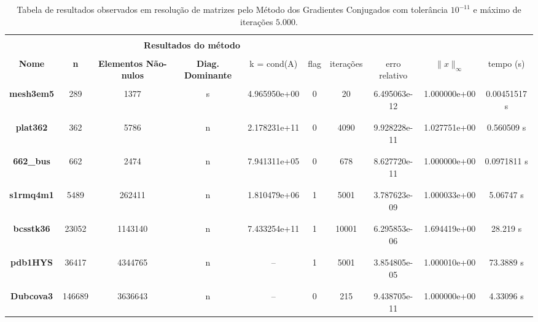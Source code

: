 
\begin{table}[ht]
    \centering
    \begin{tabular}{|c|c|c|c|c|c|c|c|c|c|}
        \hline \rowcolor{Gray}
        \multicolumn{10}{|c|}{\bfseries Tabela do Método dos Gradientes Conjugados com tolerância $10^{-11}$ e máximo de iterações $5.000$ }\\
        \hline \rowcolor{Gray}  \multicolumn{5}{|c|}{} & \multicolumn{5}{|c|}{} \\
         [-1em]  \rowcolor{Gray}
         \multicolumn{5}{|c|}{\bfseries Informações da matriz } & \multicolumn{5}{|c|}{\bfseries Resultados do método }\\
         \hline \rowcolor{Gray} & & & & & & & & & \\
         [-1em]
         \rowcolor{Gray}
         \bfseries Nome & \bfseries n & \bfseries Elementos Não-nulos & \bfseries Diag. Dominante &
         k = cond(A) & flag & iterações &
         erro relativo &
         $\|x\|_\infty$  & tempo (s) \\
         \hline & & & & & & & & & \\
         [-1em] \bfseries mesh3em5 & 289 & 1377 & s & 4.965950e+00 & 0 & 20 & 6.495063e-12 & 1.000000e+00  & 0.00451517 s \\ & & & & & & & & & \\ [-1em] \hline \\
         [-1em] \bfseries plat362 & 362 & 5786 & n & 2.178231e+11 & 0 & 4090 & 9.928228e-11 & 1.027751e+00 & 0.560509 s \\ & & & & & & & & & \\ [-1em] \hline \\
         [-1em] \bfseries 662\_bus & 662 & 2474 & n & 7.941311e+05 & 0 & 678 & 8.627720e-11 & 1.000000e+00  & 0.0971811 s \\ & & & & & & & & & \\ [-1em] \hline \\
         [-1em] \bfseries s1rmq4m1 & 5489 & 262411 & n & 1.810479e+06 & 1 & 5001 & 3.787623e-09 & 1.000033e+00  & 5.06747 s \\ & & & & & & & & & \\ [-1em] \hline \\
         [-1em] \bfseries bcsstk36 & 23052 & 1143140 & n & 7.433254e+11 & 1 & 10001 & 6.295853e-06 & 1.694419e+00  & 28.219 s \\ & & & & & & & & & \\ [-1em] \hline \\
         [-1em] \bfseries pdb1HYS & 36417 & 4344765 & n & -- & 1 & 5001 & 3.854805e-05 & 1.000010e+00 & 73.3889 s \\ & & & & & & & & & \\ [-1em] \hline \\
         [-1em] \bfseries Dubcova3 & 146689 & 3636643 & n & -- & 0 & 215 & 9.438705e-11 & 1.000000e+00 & 4.33096 s \\ \hline 
    \end{tabular}
    \caption{Tabela de resultados observados em resolução de matrizes pelo Método dos Gradientes Conjugados com tolerância $10^{-11}$ e máximo de iterações $5.000$.}
    \label{tab:resultados-5k-11}
\end{table}